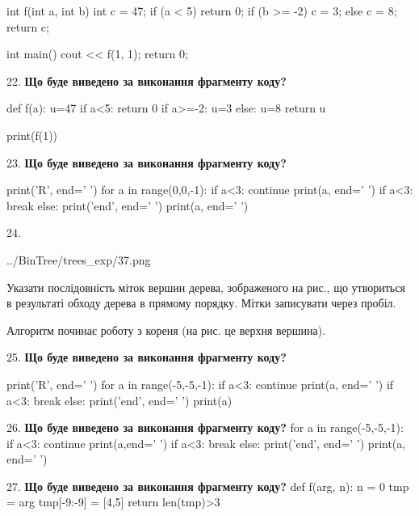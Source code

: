 \documentclass[11pt]{article}
\begin{document}
int f(int a, int b){
    int c = 47;
    if (a < 5)
        return 0;
    if (b >= -2)
         c = 3;
    else 
        c = 8;
    return c;
}

int main(){
    cout << f(1, 1);
    return 0;
}
\par\vspace{5mm}
22. \textbf{Що буде виведено за виконання фрагменту коду?}

def f(a):
    u=47
    if a<5: 
        return 0
    if a>=-2:
         u=3
    else:
         u=8
    return u

print(f(1))
\par\vspace{5mm}
23. \textbf{Що буде виведено за виконання фрагменту коду?}

print('R', end=' ')
for a in range(0,0,-1):
    if a<3:
        continue
        print(a, end=' ')
    if a<3:
        break
    else:
        print('end', end=' ')
    print(a, end=' ')
\par\vspace{5mm}
24. 

\begin{center}
	{../BinTree/trees_exp/37.png}
\end{center}
Указати послідовність міток вершин дерева, зображеного на рис., що утвориться в результаті обходу дерева в прямому порядку. Мітки записувати через пробіл.\par Алгоритм починає роботу з кореня (на рис. це верхня вершина).
\par\vspace{5mm}
25. \textbf{Що буде виведено за виконання фрагменту коду?}

print('R', end=' ')
for a in range(-5,-5,-1):
    if a<3:
        continue
        print(a, end=' ')
    if a<3:
        break
    else:
        print('end', end=' ')
    print(a)
\par\vspace{5mm}
26. \textbf{Що буде виведено за виконання фрагменту коду?}
for a in range(-5,-5,-1):
    if a<3:
        continue
        print(a,end=' ')
    if a<3:
        break
else:
    print('end', end=' ')
print(a, end=' ')
\par\vspace{5mm}
27. \textbf{Що буде виведено за виконання фрагменту коду?}
def f(arg, n):
    n = 0
    tmp = arg
    tmp[-9:-9] = [4,5]
    return len(tmp)>3
\end{document}
